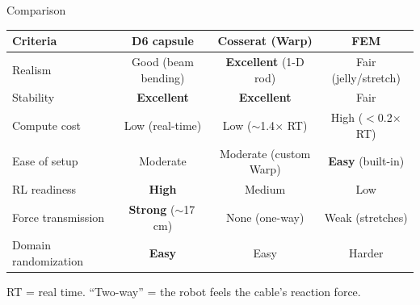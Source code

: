 \documentclass[aspectratio=169]{beamer}
\begin{document}
\begin{frame}{Comparison}
  \centering\renewcommand{\arraystretch}{1.25}
  \begin{tabular}{lccc}
    \toprule
    \textbf{Criteria} & \textbf{D6 capsule} & \textbf{Cosserat (Warp)} & \textbf{FEM} \\
    \midrule
    Realism             & Good (beam bending) & \textbf{Excellent} (1-D rod) & Fair (jelly/stretch) \\
    Stability           & \textbf{Excellent}  & \textbf{Excellent}          & Fair \\
    Compute cost        & Low (real-time)     & Low ($\sim$1.4$\times$ RT)  & High ($<$0.2$\times$ RT) \\
    Ease of setup       & Moderate            & Moderate (custom Warp)      & \textbf{Easy} (built-in) \\
    RL readiness        & \textbf{High}       & Medium                      & Low \\
    Force transmission  & \textbf{Strong} ($\sim$17\,cm) & None (one-way)     & Weak (stretches) \\
    Domain randomization& \textbf{Easy}       & Easy                        & Harder \\
    \bottomrule
  \end{tabular}
  \vfill
  {\footnotesize RT = real time. ``Two-way'' = the robot feels the cable's reaction force.}
\end{frame}
\end{document}
